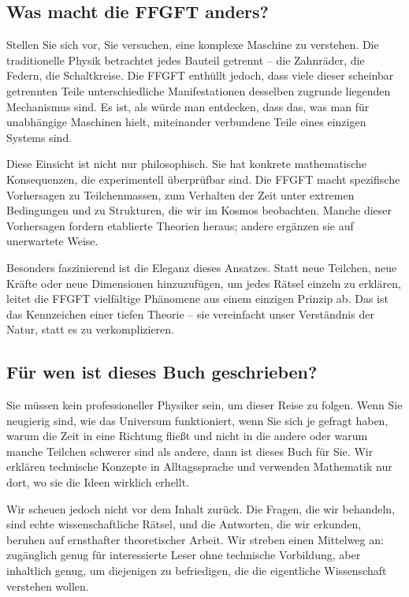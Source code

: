 \documentclass[11pt,oneside]{book}
\begin{document}
	\subsection*{Was macht die FFGFT anders?}
	
	Stellen Sie sich vor, Sie versuchen, eine komplexe Maschine zu verstehen. Die traditionelle Physik betrachtet jedes Bauteil getrennt – die Zahnräder, die Federn, die Schaltkreise. Die FFGFT enthüllt jedoch, dass viele dieser scheinbar getrennten Teile unterschiedliche Manifestationen desselben zugrunde liegenden Mechanismus sind. Es ist, als würde man entdecken, dass das, was man für unabhängige Maschinen hielt, miteinander verbundene Teile eines einzigen Systems sind.
	
	Diese Einsicht ist nicht nur philosophisch. Sie hat konkrete mathematische Konsequenzen, die experimentell überprüfbar sind. Die FFGFT macht spezifische Vorhersagen zu Teilchenmassen, zum Verhalten der Zeit unter extremen Bedingungen und zu Strukturen, die wir im Kosmos beobachten. Manche dieser Vorhersagen fordern etablierte Theorien heraus; andere ergänzen sie auf unerwartete Weise.
	
	Besonders faszinierend ist die Eleganz dieses Ansatzes. Statt neue Teilchen, neue Kräfte oder neue Dimensionen hinzuzufügen, um jedes Rätsel einzeln zu erklären, leitet die FFGFT vielfältige Phänomene aus einem einzigen Prinzip ab. Das ist das Kennzeichen einer tiefen Theorie – sie vereinfacht unser Verständnis der Natur, statt es zu verkomplizieren.
	
	\subsection*{Für wen ist dieses Buch geschrieben?}
	
	Sie müssen kein professioneller Physiker sein, um dieser Reise zu folgen. Wenn Sie neugierig sind, wie das Universum funktioniert, wenn Sie sich je gefragt haben, warum die Zeit in eine Richtung fließt und nicht in die andere oder warum manche Teilchen schwerer sind als andere, dann ist dieses Buch für Sie. Wir erklären technische Konzepte in Alltagssprache und verwenden Mathematik nur dort, wo sie die Ideen wirklich erhellt.
	
	Wir scheuen jedoch nicht vor dem Inhalt zurück. Die Fragen, die wir behandeln, sind echte wissenschaftliche Rätsel, und die Antworten, die wir erkunden, beruhen auf ernsthafter theoretischer Arbeit. Wir streben einen Mittelweg an: zugänglich genug für interessierte Leser ohne technische Vorbildung, aber inhaltlich genug, um diejenigen zu befriedigen, die die eigentliche Wissenschaft verstehen wollen.
	
\end{document}
